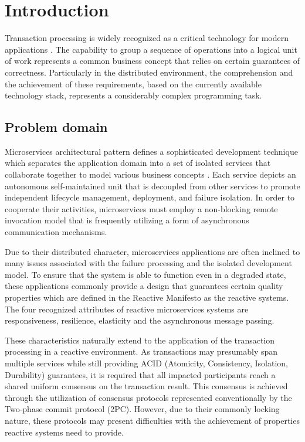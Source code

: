 \documentclass[oneside,
  digital, %
  table,   %
  lof,     %
  lot,     %
]{fithesis3}
\begin{document}
\chapter{Introduction}

Transaction processing is widely recognized as a critical technology for modern applications \cite{java_tran_processing}. The capability to group a sequence of operations into a logical unit of work represents a common business concept that relies on certain guarantees of correctness. Particularly in the distributed environment, the comprehension and the achievement of these requirements, based on the currently available technology stack, represents a considerably complex programming task.

\section{Problem domain}

Microservices architectural pattern defines a sophisticated development technique which separates the application domain into a set of isolated services that collaborate together to model various business concepts \cite{building_ms}. Each service depicts an autonomous self-maintained unit that is decoupled from other services to promote independent lifecycle management, deployment, and failure isolation. In order to cooperate their activities, microservices must employ a non-blocking remote invocation model that is frequently utilizing a form of asynchronous communication mechanisms.

Due to their distributed character, microservices applications are often inclined to many issues associated with the failure processing and the isolated development model. To ensure that the system is able to function even in a degraded state, these applications commonly provide a design that guarantees certain quality properties which are defined in the Reactive Manifesto \cite{reactive_manifesto} as the reactive systems. The four recognized attributes of reactive microservices systems are responsiveness, resilience, elasticity and the asynchronous message passing.

These characteristics naturally extend to the application of the transaction processing in a reactive environment. As transactions may presumably span multiple services while still providing ACID (Atomicity, Consistency, Isolation, Durability) guarantees, it is required that all impacted participants reach a shared uniform consensus on the transaction result. This consensus is achieved through the utilization of consensus protocols represented conventionally by the Two-phase commit protocol (2PC). However, due to their commonly locking nature, these protocols may present difficulties with the achievement of properties reactive systems need to provide.
\end{document}
